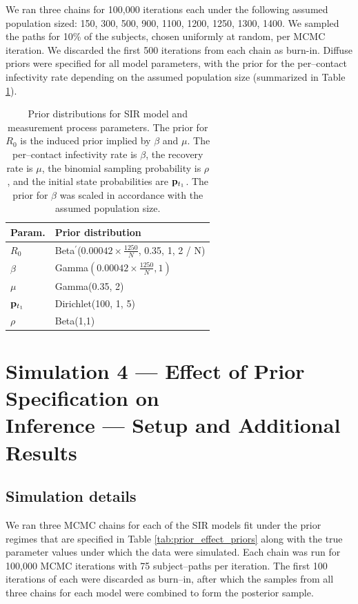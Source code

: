 We ran three chains for 100,000 iterations each under the following assumed population sized: 150, 300, 500, 900, 1100, 1200, 1250, 1300, 1400. We sampled the paths for 10\% of the subjects, chosen uniformly at random, per MCMC iteration. We discarded the first 500 iterations from each chain as burn-in. Diffuse priors were specified for all model parameters, with the prior for the per--contact infectivity rate depending on the assumed population size (summarized in Table \ref{tab:popsize_misspec_priors}).

\begin{table}[htbp]
	\centering
	\begin{tabular}{ll}
		\hline
		Param. & Prior distribution \\ 
		\hline
		$ R_0 $ &  Beta$ ^\prime $($ 0.00042 \times \frac{1250}{N} $, 0.35, 1, 2 / N) \\
		$ \beta $ &  Gamma$ (0.00042 \times \frac{1250}{N}, 1) $ \\ 
		$ \mu $ & Gamma(0.35, 2)  \\ 
		$ \mathbf{p}_{t_1} $ & Dirichlet(100, 1, 5)  \\ 
		$ \rho $ & Beta(1,1) \\
		\hline
	\end{tabular}
	\caption{Prior distributions for SIR model and measurement process parameters. The prior for $ R_0 $ is the induced prior implied by $ \beta $ and $ \mu $. The per--contact infectivity rate is $ \beta $, the recovery rate is $ \mu $, the binomial sampling probability is $ \rho $, and the initial state probabilities are $ \mathbf{p}_{t_1} $. The prior for $ \beta $ was scaled in accordance with the assumed population size.}
	\label{tab:popsize_misspec_priors}
\end{table}

\newpage

\section{Simulation 4 --- Effect of Prior Specification on\\ Inference --- Setup and Additional Results}
\label{sec:prior_effect_details}
\subsection{Simulation details}
We ran three MCMC chains for each of the SIR models fit under the prior regimes that are specified in Table \ref{tab:prior_effect_priors} along with the true parameter values under which the data were simulated. Each chain was run for 100,000 MCMC iterations  with 75 subject--paths per iteration. The first 100 iterations of each were discarded as burn--in, after which the samples from all three chains for each model were combined to form the posterior sample.

